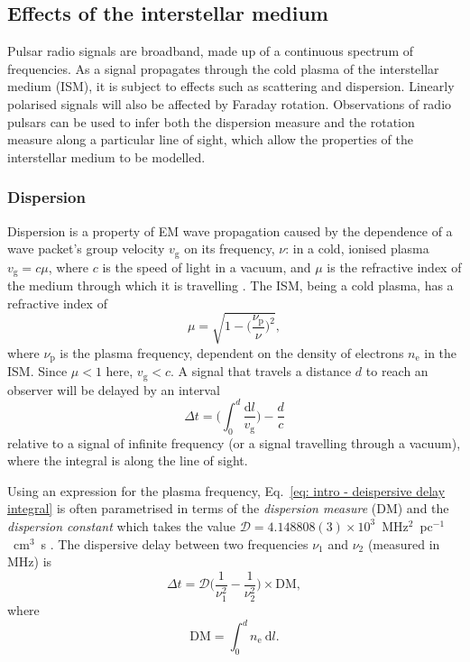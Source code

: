 \subsection{Effects of the interstellar medium}
\label{sec: intro - observation processing - ISM effects}

Pulsar radio signals are broadband, made up of a continuous spectrum of frequencies. As a signal propagates through the cold plasma of the interstellar medium (ISM), it is subject to effects such as scattering and dispersion. Linearly polarised signals will also be affected by Faraday rotation. Observations of radio pulsars can be used to infer both the dispersion measure and the rotation measure along a particular line of sight, which allow the properties of the interstellar medium to be modelled.

\subsubsection{Dispersion}
\label{sec: intro - observation processing - ISM effects - dispersion}

Dispersion is a property of EM wave propagation caused by the dependence of a wave packet's group velocity $v_\mathrm{g}$ on its frequency, $\nu$: in a cold, ionised plasma $v_\mathrm{g} = c\mu$, where $c$ is the speed of light in a vacuum, and $\mu$ is the refractive index of the medium through which it is travelling \citep{Handbook}. The ISM, being a cold plasma, has a refractive index of 
\begin{equation}
    \label{eq: intro - ISM refractive index}
    \mu = \sqrt{1-\bigg(\frac{\nu_\mathrm{p}}{\nu}\bigg)^2},
\end{equation}
where $\nu_\mathrm{p}$ is the plasma frequency, dependent on the density of electrons $n_\mathrm{e}$ in the ISM. Since $\mu < 1$ here, $v_\mathrm{g} < c$. A signal that travels a distance $d$ to reach an observer will be delayed by an interval
\begin{equation}
    \label{eq: intro - deispersive delay integral}
    \Delta t = \bigg( \int^d_0 \frac{\mathrm{d}l}{v_\mathrm{g}} \bigg) - \frac{d}{c}
\end{equation}
relative to a signal of infinite frequency (or a signal travelling through a vacuum), where the integral is along the line of sight.

Using an expression for the plasma frequency, Eq.~\ref{eq: intro - deispersive delay integral} is often parametrised in terms of the \textit{dispersion measure} (DM) and the \textit{dispersion constant} which takes the value $\mathcal{D} = 4.148808(3)\times 10^3$~MHz$^2$~pc$^{-1}$~cm$^3$~s \citep{MTxx1972,Handbook}. The dispersive delay between two frequencies $\nu_1$ and $\nu_2$ (measured in MHz) is 
\begin{equation}
    \label{eq: intro - dispersive delay}
	\Delta t = \mathcal{D} \bigg(\frac{1}{\nu_1^2} - \frac{1}{\nu_2^2}\bigg) \times \mathrm{DM},
\end{equation}
where
\begin{equation}
    \label{eq: intro - dispersion measure definition}
	\mathrm{DM} = \int^d_0 n_\mathrm{e}\ \mathrm{d}l.
\end{equation}


